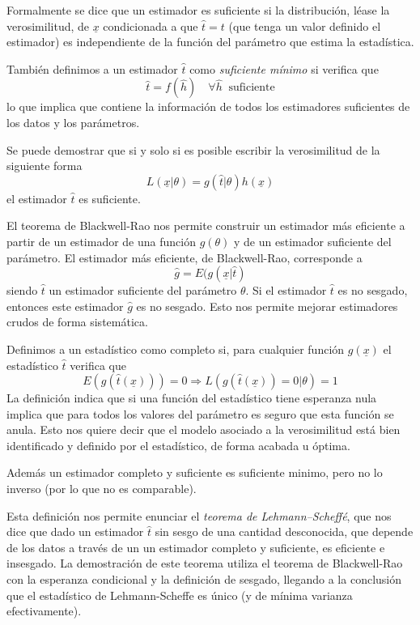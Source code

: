 \documentclass{article}
\numberwithin{equation}{section} %
\begin{document}
Formalmente se dice que un estimador es suficiente si la distribución, léase la verosimilitud, de $\underline{x}$ condicionada a que $\hat{t} = t$ (que tenga un valor definido el estimador) es independiente de la función del parámetro que estima la estadística. 

También definimos a un estimador $\hat{t}$ como \emph{suficiente mínimo} si verifica que
\begin{equation}
\hat{t} = f(\hat{h}) \quad \forall \hat{h} \; \; \text{suficiente}
\end{equation} 
lo que implica que contiene la información de todos los estimadores suficientes de los datos y los parámetros.

Se puede demostrar que si y solo si es posible escribir la verosimilitud de la siguiente forma
\begin{equation}
L(\underline{x}|\theta) = g(\hat{t}|\theta) h(\underline{x})
\end{equation}
el estimador $\hat{t}$ es suficiente.

El teorema de Blackwell-Rao nos permite construir un estimador más eficiente a partir de un estimador de una función $g(\theta)$ y de un estimador suficiente del parámetro. El estimador más eficiente, de Blackwell-Rao, corresponde a
\begin{equation}
\hat{g} = E(g(\underline{x}|\hat{t})
\end{equation}
siendo $\hat{t}$ un estimador suficiente del parámetro $\theta$. Si el estimador $\hat{t}$ es no sesgado, entonces este estimador $\hat{g}$ es no sesgado. Esto nos permite mejorar estimadores crudos de forma sistemática.

Definimos a un estadístico como completo si, para cualquier función $g(\underline{x})$ el estadístico $\hat{t}$ verifica que
\begin{equation}
E(g(\hat{t}(\underline{x}))) = 0 \Rightarrow L(g(\hat{t}(\underline{x})) = 0 | \theta) = 1
\end{equation}
La definición indica que si una función del estadístico tiene esperanza nula implica que para todos los valores del parámetro es seguro que esta función se anula. Esto nos quiere decir que el modelo asociado a la verosimilitud está bien identificado y definido por el estadístico, de forma acabada u óptima. 

Además un estimador completo y suficiente es suficiente minimo, pero no lo inverso (por lo que no es comparable). 

Esta definición nos permite enunciar el \emph{teorema de Lehmann–Scheffé}, que nos dice que dado un estimador $\hat{t}$ sin sesgo de una cantidad desconocida, que depende de los datos a través de un un estimador completo y suficiente, es eficiente e insesgado. La demostración de este teorema utiliza el teorema de Blackwell-Rao con la esperanza condicional y la definición de sesgado, llegando a la conclusión que el estadístico de Lehmann-Scheffe es único (y de mínima varianza efectivamente).
\end{document}
